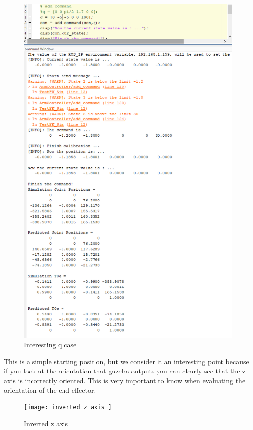 \documentclass[12pt]{article}
\begin{document}
\begin{enumerate}
\begin{figure} [h!]
\includegraphics[scale=.4]{interesting q case}
\caption{Interesting q case}
\end{figure}


\newpage
\par{
This is a simple starting position, but we consider it an interesting point because if you look at the orientation that gazebo outputs you can clearly see that the z axis is incorrectly oriented. This is very important to know when evaluating the orientation of the end effector.
}\\
\begin{figure}  [h!]
	\centering 
\texttt{[image: inverted z axis ]}
\caption{Inverted z axis }
\end{figure}


\end{enumerate}
\end{document}
